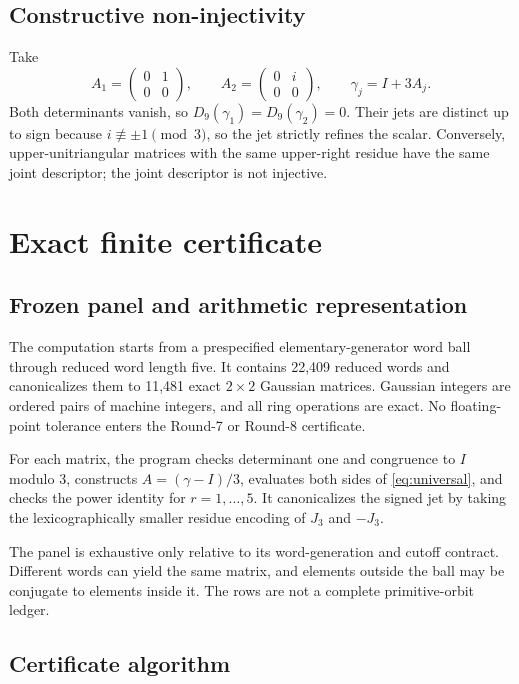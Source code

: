 \documentclass[11pt,a4paper]{article}
\theoremstyle{definition}
\theoremstyle{remark}
\begin{document}
\subsection{Constructive non-injectivity}

Take
\[
 A_1=\begin{pmatrix}0&1\\0&0\end{pmatrix},\qquad
 A_2=\begin{pmatrix}0&i\\0&0\end{pmatrix},\qquad
 \gamma_j=I+3A_j.
\]
Both determinants vanish, so \(D_9(\gamma_1)=D_9(\gamma_2)=0\). Their jets are distinct up to sign because \(i\not\equiv\pm1\pmod3\), so the jet strictly refines the scalar. Conversely, upper-unitriangular matrices with the same upper-right residue have the same joint descriptor; the joint descriptor is not injective.

\section{Exact finite certificate}

\subsection{Frozen panel and arithmetic representation}

The computation starts from a prespecified elementary-generator word ball through reduced word length five. It contains 22,409 reduced words and canonicalizes them to 11,481 exact \(2\times2\) Gaussian matrices. Gaussian integers are ordered pairs of machine integers, and all ring operations are exact. No floating-point tolerance enters the Round-7 or Round-8 certificate.

For each matrix, the program checks determinant one and congruence to \(I\) modulo \(3\), constructs \(A=(\gamma-I)/3\), evaluates both sides of \cref{eq:universal}, and checks the power identity for \(r=1,\ldots,5\). It canonicalizes the signed jet by taking the lexicographically smaller residue encoding of \(J_3\) and \(-J_3\).

The panel is exhaustive only relative to its word-generation and cutoff contract. Different words can yield the same matrix, and elements outside the ball may be conjugate to elements inside it. The rows are not a complete primitive-orbit ledger.

\subsection{Certificate algorithm}
\end{document}
